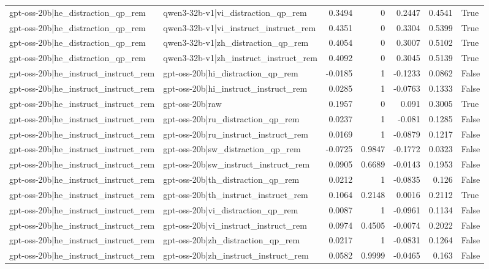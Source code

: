 \begin{table}
\begin{tabular}{l l r r r r l}
gpt-oss-20b|he_distraction_qp_rem & qwen3-32b-v1|vi_distraction_qp_rem & 0.3494 & 0 & 0.2447 & 0.4541 & True \\
gpt-oss-20b|he_distraction_qp_rem & qwen3-32b-v1|vi_instruct_instruct_rem & 0.4351 & 0 & 0.3304 & 0.5399 & True \\
gpt-oss-20b|he_distraction_qp_rem & qwen3-32b-v1|zh_distraction_qp_rem & 0.4054 & 0 & 0.3007 & 0.5102 & True \\
gpt-oss-20b|he_distraction_qp_rem & qwen3-32b-v1|zh_instruct_instruct_rem & 0.4092 & 0 & 0.3045 & 0.5139 & True \\
gpt-oss-20b|he_instruct_instruct_rem & gpt-oss-20b|hi_distraction_qp_rem & -0.0185 & 1 & -0.1233 & 0.0862 & False \\
gpt-oss-20b|he_instruct_instruct_rem & gpt-oss-20b|hi_instruct_instruct_rem & 0.0285 & 1 & -0.0763 & 0.1333 & False \\
gpt-oss-20b|he_instruct_instruct_rem & gpt-oss-20b|raw & 0.1957 & 0 & 0.091 & 0.3005 & True \\
gpt-oss-20b|he_instruct_instruct_rem & gpt-oss-20b|ru_distraction_qp_rem & 0.0237 & 1 & -0.081 & 0.1285 & False \\
gpt-oss-20b|he_instruct_instruct_rem & gpt-oss-20b|ru_instruct_instruct_rem & 0.0169 & 1 & -0.0879 & 0.1217 & False \\
gpt-oss-20b|he_instruct_instruct_rem & gpt-oss-20b|sw_distraction_qp_rem & -0.0725 & 0.9847 & -0.1772 & 0.0323 & False \\
gpt-oss-20b|he_instruct_instruct_rem & gpt-oss-20b|sw_instruct_instruct_rem & 0.0905 & 0.6689 & -0.0143 & 0.1953 & False \\
gpt-oss-20b|he_instruct_instruct_rem & gpt-oss-20b|th_distraction_qp_rem & 0.0212 & 1 & -0.0835 & 0.126 & False \\
gpt-oss-20b|he_instruct_instruct_rem & gpt-oss-20b|th_instruct_instruct_rem & 0.1064 & 0.2148 & 0.0016 & 0.2112 & True \\
gpt-oss-20b|he_instruct_instruct_rem & gpt-oss-20b|vi_distraction_qp_rem & 0.0087 & 1 & -0.0961 & 0.1134 & False \\
gpt-oss-20b|he_instruct_instruct_rem & gpt-oss-20b|vi_instruct_instruct_rem & 0.0974 & 0.4505 & -0.0074 & 0.2022 & False \\
gpt-oss-20b|he_instruct_instruct_rem & gpt-oss-20b|zh_distraction_qp_rem & 0.0217 & 1 & -0.0831 & 0.1264 & False \\
gpt-oss-20b|he_instruct_instruct_rem & gpt-oss-20b|zh_instruct_instruct_rem & 0.0582 & 0.9999 & -0.0465 & 0.163 & False \\

\end{tabular}
\end{table}
